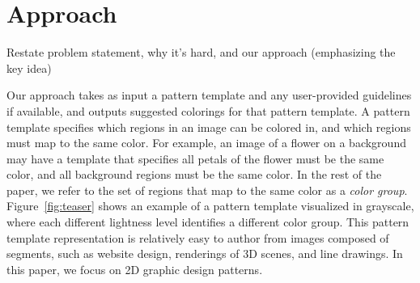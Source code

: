 \section{Approach}
\label{sec:approach}


Restate problem statement, why it's hard, and our approach (emphasizing the key idea)~

Our approach takes as input a pattern template and any user-provided guidelines if available, and outputs suggested colorings for that pattern template. A pattern template specifies which regions in an image can be colored in, and which regions must map to the same color. For example, an image of a flower on a background may have a template that specifies all petals of the flower must be the same color, and all background regions must be the same color. In the rest of the paper, we refer to the set of regions that map to the same color as a \emph{color group}. Figure~\ref{fig:teaser} shows an example of a pattern template visualized in grayscale, where each different lightness level identifies a different color group. This pattern template representation is relatively easy to author from images composed of segments, such as website design, renderings of 3D scenes, and line drawings. In this paper, we focus on 2D graphic design patterns. 




